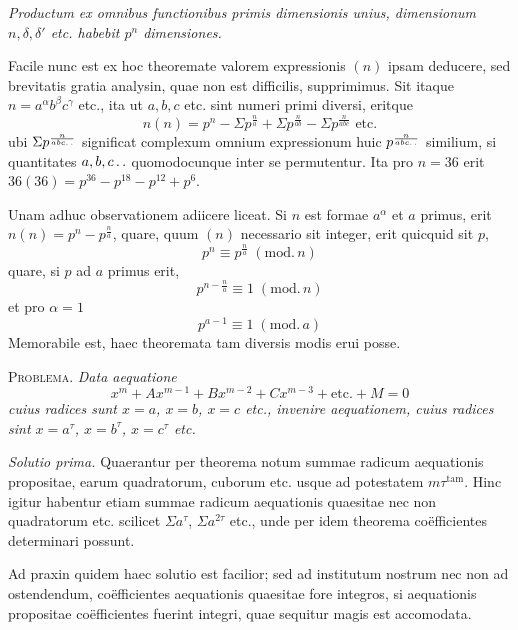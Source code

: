 \emph{Productum ex omnibus functionibus primis dimensionis unius, dimensionum $n,\delta,\delta'$ etc. habebit $p^n$ dimensiones.}

Facile nunc est ex hoc theoremate valorem expressionis $(n)$ ipsam deducere, sed brevitatis gratia analysin, quae non est difficilis, supprimimus. Sit itaque $n=a^\alpha b^\beta c^\gamma$ etc., ita ut $a,b,c$ etc. sint numeri primi diversi, eritque
\[
n(n)=p^n-\Sigma p^{\frac na}+\Sigma p^{\frac n{ab}}-\Sigma p^{\frac n{abc}}\text{ etc.}
\]
ubi $\Sigma p^{\frac n{abc\mathinner{.\,.}}}$ significat complexum omnium expressionum huic $p^{\frac n{abc\mathinner{.\,.}}}$ similium, si quantitates $a,b,c\mathinner{.\,.}$ quomodocunque inter se permutentur. Ita pro $n=36$ erit $36(36)=p^{36}-p^{18}-p^{12}+p^6$.

Unam adhuc observationem adiicere liceat. Si $n$ est formae $a^\alpha$ et $a$ primus, erit $n(n)=p^n-p^{\frac na}$, quare, quum $(n)$ necessario sit integer, erit quicquid sit $p$,
\[
p^n\equiv p^{\frac na}\;(\mathrm{mod.}\,n)
\]
quare, si $p$ ad $a$ primus erit,
\[
p^{n-\frac na}\equiv1\;(\mathrm{mod.}\,n)
\]
et pro $\alpha=1$
\[
p^{a-1}\equiv1\;(\mathrm{mod.}\,a)
\]
Memorabile est, haec theoremata tam diversis modis erui posse.

\textsc{Problema.} \emph{Data aequatione}
\[
x^m+Ax^{m-1}+Bx^{m-2}+Cx^{m-3}+\text{etc.}+M=0
\]
\emph{cuius radices sunt $x=a$, $x=b$, $x=c$ etc., invenire aequationem, cuius radices sint $x=a^\tau$, $x=b^\tau$, $x=c^\tau$ etc.}

%
\emph{Solutio prima.} Quaerantur per theorema notum summae radicum aequationis propositae, earum quadratorum, cuborum etc. usque ad potestatem $m\tau^{\mathrm{tam}}$. Hinc igitur habentur etiam summae radicum aequationis quaesitae nec non quadratorum etc. scilicet $\Sigma a^\tau$, $\Sigma a^{2\tau}$ etc., unde per idem theorema coëfficientes determinari possunt.

Ad praxin quidem haec solutio est facilior; sed ad institutum nostrum nec non ad ostendendum, coëfficientes aequationis quaesitae fore integros, si aequationis propositae coëfficientes fuerint integri, quae sequitur magis est accomodata.

